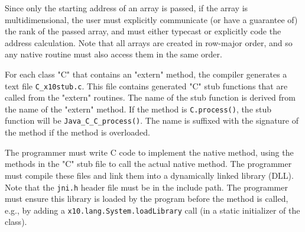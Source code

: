 Since only the starting address of an array is passed, if the array is
multidimensional, the user must explicitly communicate (or have a
guarantee of) the rank of the passed array, and must either typecast
or explicitly code the address calculation.  Note that all \Xten{}
arrays are created in row-major order, and so any native routine must
also access them in the same order.

For each class \xcd"C" that contains an \xcd"extern" method, the
\Xten{} compiler generates a text file {\tt C\_x10stub.c}.  This file
contains generated \xcd"C" stub functions that are called from the
\xcd"extern" routines.  The name of the stub function is derived from
the name of the \xcd"extern" method. If the method is
{\tt C.process()}, the stub function will be
{\tt Java\_C\_C\_process()}. The name is suffixed with the signature of the
method if the method is overloaded.

The programmer must write C code to implement the native method,
using the methods in the \xcd"C" stub file to call the actual native
method.  The programmer must compile these files and link them into a
dynamically linked library (DLL).  Note that the {\tt jni.h} header file
must be in the include path.  The programmer must ensure this library
is loaded by the program before the method is called, e.g., by
adding a
{\tt x10.lang.System.loadLibrary} call (in a static initializer of the
\Xten{} class).

